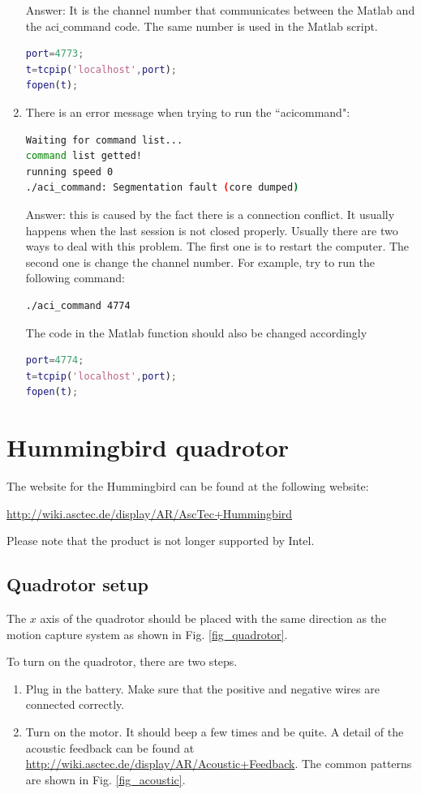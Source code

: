 \documentclass[idxtotoc,hyperref,openany]{labbook} %
\begin{document}
\begin{enumerate}
Answer: It is the channel number that communicates between the Matlab and the aci$\_$command code. The same number is used in the Matlab script.

\begin{lstlisting}[language=Matlab]
port=4773; 
t=tcpip('localhost',port);
fopen(t);
\end{lstlisting}

\item There is an error message when trying to run the ``aci\textunderscore command":
\begin{lstlisting}[language=bash]
Waiting for command list...
command list getted!
running speed 0
./aci_command: Segmentation fault (core dumped)
\end{lstlisting}

Answer: this is caused by the fact there is a connection conflict. It usually happens when the last session is not closed properly. Usually there are two ways to deal with this problem. The first one is to restart the computer. The second one is change the channel number. For example, try to run the following command:
\begin{lstlisting}[language=bash]
./aci_command 4774
\end{lstlisting}

The code in the Matlab function should also be changed accordingly
\begin{lstlisting}[language=Matlab]
port=4774; 
t=tcpip('localhost',port);
fopen(t);
\end{lstlisting}
\end{enumerate}


\newpage
\section{Hummingbird quadrotor}

The website for the Hummingbird can be found at the following website:

\url{http://wiki.asctec.de/display/AR/AscTec+Hummingbird}

Please note that the product is not longer supported by Intel. 
\subsection{Quadrotor setup}
The $x$ axis of the quadrotor should be placed with the same direction as the motion capture system as shown in Fig. \ref{fig_quadrotor}.

To turn on the quadrotor, there are two steps.
\begin{enumerate}
\item Plug in the battery. Make sure that the positive and negative wires are connected correctly. 
\item Turn on the motor. It should beep a few times and be quite. A detail of the acoustic feedback can be found at \url{http://wiki.asctec.de/display/AR/Acoustic+Feedback}. The common patterns are shown in Fig. \ref{fig_acoustic}.
\end{enumerate}
\end{document}
